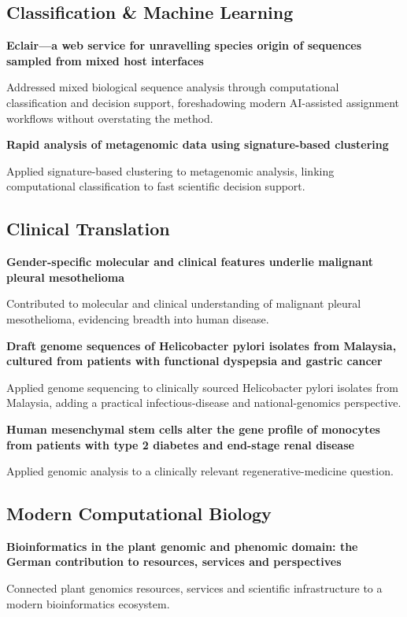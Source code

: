 \subsection*{Classification \& Machine Learning}
\textbf{Eclair---a web service for unravelling species origin of sequences sampled from mixed host interfaces}\par Addressed mixed biological sequence analysis through computational classification and decision support, foreshadowing modern AI-assisted assignment workflows without overstating the method.\par
\textbf{Rapid analysis of metagenomic data using signature-based clustering}\par Applied signature-based clustering to metagenomic analysis, linking computational classification to fast scientific decision support.\par
\subsection*{Clinical Translation}
\textbf{Gender-specific molecular and clinical features underlie malignant pleural mesothelioma}\par Contributed to molecular and clinical understanding of malignant pleural mesothelioma, evidencing breadth into human disease.\par
\textbf{Draft genome sequences of Helicobacter pylori isolates from Malaysia, cultured from patients with functional dyspepsia and gastric cancer}\par Applied genome sequencing to clinically sourced Helicobacter pylori isolates from Malaysia, adding a practical infectious-disease and national-genomics perspective.\par
\textbf{Human mesenchymal stem cells alter the gene profile of monocytes from patients with type 2 diabetes and end-stage renal disease}\par Applied genomic analysis to a clinically relevant regenerative-medicine question.\par
\subsection*{Modern Computational Biology}
\textbf{Bioinformatics in the plant genomic and phenomic domain: the German contribution to resources, services and perspectives}\par Connected plant genomics resources, services and scientific infrastructure to a modern bioinformatics ecosystem.\par
